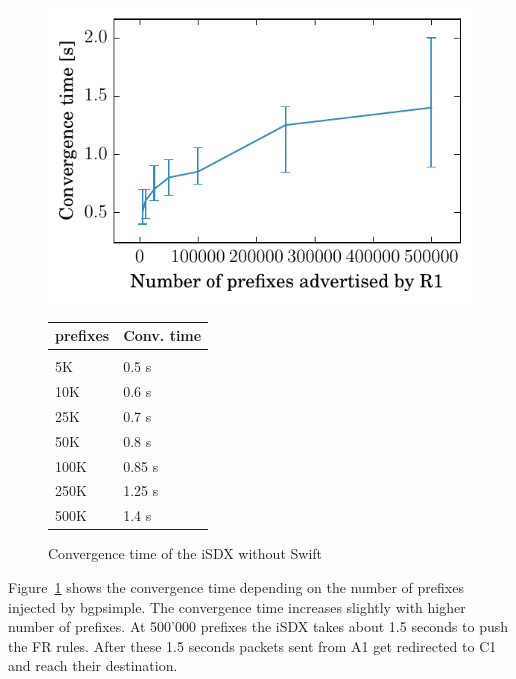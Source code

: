 \begin{figure}[h]
\centering
\begin{minipage}[t]{.4\textwidth}
\centering
\vspace{0pt}
\includegraphics[scale = 1]{Figures/swift.pdf}
\caption{Convergence time of the iSDX without Swift}
\label{fig:withswift}
\end{minipage}\hfill
\begin{minipage}[t]{.4\textwidth}
\centering
\vspace{0pt}
\begin{tabular}{@{}ll@{}}
	\\
	prefixes & Conv. time \\
	\hline
	\\
    5K & 0.5 s  \\
    10K & 0.6 s   \\
    25K & 0.7 s   \\
    50K & 0.8 s  \\
    100K & 0.85 s \\
    250K & 1.25 s   \\
    500K & 1.4 s  \\
\end{tabular}
\end{minipage}
\end{figure}

Figure~\ref{fig:withswift} shows the convergence time depending on the number of prefixes injected by bgpsimple.
The convergence time increases slightly with higher number of prefixes. At 500'000 prefixes the iSDX takes about 1.5 seconds to push the FR rules. After these 1.5 seconds packets sent from A1 get redirected to C1 and reach their destination. \\


